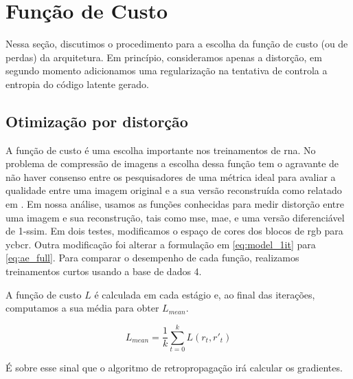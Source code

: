 \section {Função de Custo}
Nessa seção, discutimos o procedimento para a escolha da função de custo (ou de perdas) da arquitetura. Em princípio, consideramos apenas a distorção, em segundo momento adicionamos uma regularização na tentativa de controla a entropia do código latente gerado.

\subsection{Otimização por distorção}


A função de custo é uma escolha importante nos treinamentos de \acrshort{rna}. No problema de compressão de imagens a escolha dessa função tem o agravante de não haver consenso entre os pesquisadores de uma métrica ideal para avaliar a qualidade entre uma imagem original e a sua versão reconstruída como relatado em \cite{Priming2017Johnston,End2016Balle}.   
Em nossa análise, usamos as funções conhecidas para medir distorção entre uma imagem e sua reconstrução, tais como \acrshort{mse}, \acrshort{mae}, e uma versão diferenciável de 1-\acrshort{ssim}. Em dois testes, modificamos o espaço de cores dos blocos de \acrshort{rgb} para \acrshort{ycbcr}. Outra modificação foi alterar a formulação em \ref{eq:model_1it} para \ref{eq:ae_full}.  Para comparar o desempenho de cada função, realizamos treinamentos curtos usando a base de dados 4. 

A função de custo $L$ é calculada em cada estágio e, ao final das iterações, computamos a sua média para obter $L_{mean}$. 

\begin{equation}
L_{mean} = \frac{1}{k} \sum_{t=0}^k L(r_t,r'_t) 
\end{equation}

É sobre esse sinal que o algoritmo de retropropagação irá calcular os gradientes.




